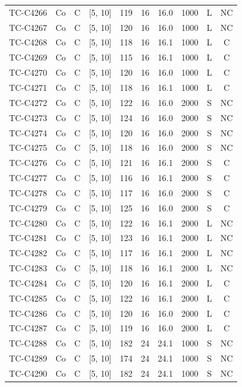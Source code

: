 \begin{longtable}{lccccccccc}
TC-C4266 & Co & C & [5, 10] & 119 & 16 & 16.0 & 1000 & L & NC \\
TC-C4267 & Co & C & [5, 10] & 120 & 16 & 16.0 & 1000 & L & NC \\
TC-C4268 & Co & C & [5, 10] & 118 & 16 & 16.1 & 1000 & L & C \\
TC-C4269 & Co & C & [5, 10] & 115 & 16 & 16.1 & 1000 & L & C \\
TC-C4270 & Co & C & [5, 10] & 120 & 16 & 16.0 & 1000 & L & C \\
TC-C4271 & Co & C & [5, 10] & 118 & 16 & 16.1 & 1000 & L & C \\
TC-C4272 & Co & C & [5, 10] & 122 & 16 & 16.0 & 2000 & S & NC \\
TC-C4273 & Co & C & [5, 10] & 124 & 16 & 16.0 & 2000 & S & NC \\
TC-C4274 & Co & C & [5, 10] & 120 & 16 & 16.0 & 2000 & S & NC \\
TC-C4275 & Co & C & [5, 10] & 118 & 16 & 16.0 & 2000 & S & NC \\
TC-C4276 & Co & C & [5, 10] & 121 & 16 & 16.1 & 2000 & S & C \\
TC-C4277 & Co & C & [5, 10] & 116 & 16 & 16.1 & 2000 & S & C \\
TC-C4278 & Co & C & [5, 10] & 117 & 16 & 16.0 & 2000 & S & C \\
TC-C4279 & Co & C & [5, 10] & 125 & 16 & 16.0 & 2000 & S & C \\
TC-C4280 & Co & C & [5, 10] & 122 & 16 & 16.1 & 2000 & L & NC \\
TC-C4281 & Co & C & [5, 10] & 123 & 16 & 16.1 & 2000 & L & NC \\
TC-C4282 & Co & C & [5, 10] & 117 & 16 & 16.1 & 2000 & L & NC \\
TC-C4283 & Co & C & [5, 10] & 118 & 16 & 16.1 & 2000 & L & NC \\
TC-C4284 & Co & C & [5, 10] & 120 & 16 & 16.1 & 2000 & L & C \\
TC-C4285 & Co & C & [5, 10] & 122 & 16 & 16.1 & 2000 & L & C \\
TC-C4286 & Co & C & [5, 10] & 120 & 16 & 16.0 & 2000 & L & C \\
TC-C4287 & Co & C & [5, 10] & 119 & 16 & 16.0 & 2000 & L & C \\
TC-C4288 & Co & C & [5, 10] & 182 & 24 & 24.1 & 1000 & S & NC \\
TC-C4289 & Co & C & [5, 10] & 174 & 24 & 24.1 & 1000 & S & NC \\
TC-C4290 & Co & C & [5, 10] & 182 & 24 & 24.1 & 1000 & S & NC \\

\end{longtable}
